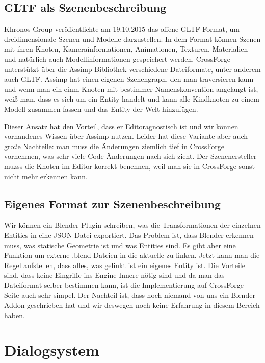 \subsection{GLTF als Szenenbeschreibung}

Khronos Group veröffentlichte am 19.10.2015 das offene GLTF Format, um dreidimensionale Szenen und Modelle darzustellen. In dem Format können Szenen mit ihren Knoten, Kamerainformationen, Animationen, Texturen, Materialien und natürlich auch Modellinformationen gespeichert werden. CrossForge unterstützt über die Assimp Bibliothek verschiedene Dateiformate, unter anderem auch GLTF. Assimp hat einen eigenen Szenengraph, den man traversieren kann und wenn man ein einm Knoten mit bestimmer Namenskonvention angelangt ist, weiß man, dass es sich um ein Entity handelt und kann alle Kindknoten zu einem Modell zusammen fassen und das Entity der Welt hinzufügen. 

Dieser Ansatz hat den Vorteil, dass er Editoragnostisch ist und wir können vorhandenes Wissen über Assimp nutzen. Leider hat diese Variante aber auch große Nachteile: man muss die Änderungen ziemlich tief in CrossForge vornehmen, was sehr viele Code Änderungen nach sich zieht. Der Szenenersteller muzss die Knoten im Editor korrekt benennen, weil man sie in CrossForge sonst nicht mehr erkennen kann.

\subsection{Eigenes Format zur Szenenbeschreibung}

Wir können ein Blender Plugin schreiben, was die Transformationen der einzelnen Entities in eine JSON-Datei exportiert. Das Problem ist, dass Blender erkennen muss, was statische Geometrie ist und was Entities sind. Es gibt aber eine Funktion um externe .blend Dateien in die aktuelle zu linken. Jetzt kann man die Regel aufstellen, dass alles, was gelinkt ist ein eigenes Entity ist. Die Vorteile sind, dass keine Eingriffe ins Engine-Innere nötig sind und da man das Dateiformat selber bestimmen kann, ist die Implementierung auf CrossForge Seite auch sehr simpel. Der Nachteil ist, dass noch niemand von uns ein Blender Addon geschrieben hat und wir deswegen noch keine Erfahrung in diesem Bereich haben.

\section{Dialogsystem}

